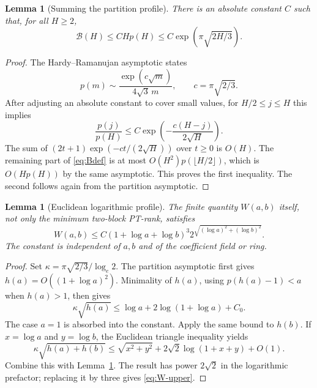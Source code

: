 \documentclass[11pt]{article}
\newtheorem{lemma}[theorem]{Lemma}
\theoremstyle{definition}
\theoremstyle{remark}
\newcommand{\Bnd}{\mathcal B}
\begin{document}
\begin{lemma}[Summing the partition profile]
\label{lem:B-asymptotic}
There is an absolute constant $C$ such that, for all $H\ge2$,
\begin{equation}
\label{eq:B-upper}
 \Bnd(H)\le CHp(H)
 \le C\exp\!\left(\pi\sqrt{2H/3}\right).
\end{equation}
\end{lemma}

\begin{proof}
The Hardy--Ramanujan asymptotic \cite{dlmf} states
\[
 p(m)\sim\frac{\exp(c\sqrt m)}{4\sqrt3\,m},
 \qquad c=\pi\sqrt{2/3}.
\]
After adjusting an absolute constant to cover small values, for
$H/2\le j\le H$ this implies
\[
 \frac{p(j)}{p(H)}
 \le C\exp\!\left(-\frac{c(H-j)}{2\sqrt H}\right).
\]
The sum of $(2t+1)\exp(-ct/(2\sqrt H))$ over $t\ge0$ is $O(H)$.
The remaining part of \eqref{eq:Bdef} is at most
$O(H^2)p(\lfloor H/2\rfloor)$, which is $O(Hp(H))$ by the same
asymptotic. This proves the first inequality. The second follows
again from the partition asymptotic.
\end{proof}

\begin{lemma}[Euclidean logarithmic profile]
\label{lem:euclidean}
The finite quantity $W(a,b)$ itself, not only the minimum
two-block PT-rank, satisfies
\begin{equation}
\label{eq:W-upper}
 W(a,b)\le
 C(1+\log a+\log b)^3
 2^{\sqrt{(\log a)^2+(\log b)^2}}.
\end{equation}
The constant is independent of $a,b$ and of the coefficient field
or ring.
\end{lemma}

\begin{proof}
Set $\kappa=\pi\sqrt{2/3}/\log_e2$. The partition asymptotic first
gives $h(a)=O((1+\log a)^2)$. Minimality of $h(a)$, using
$p(h(a)-1)<a$ when $h(a)>1$, then gives
\begin{equation}
\label{eq:h-invert}
 \kappa\sqrt{h(a)}
 \le\log a+2\log(1+\log a)+C_0.
\end{equation}
The case $a=1$ is absorbed into the constant. Apply the same bound
to $h(b)$. If $x=\log a$ and $y=\log b$, the Euclidean triangle
inequality yields
\[
 \kappa\sqrt{h(a)+h(b)}
 \le\sqrt{x^2+y^2}
 +2\sqrt2\log(1+x+y)+O(1).
\]
Combine this with Lemma~\ref{lem:B-asymptotic}. The result has
power $2\sqrt2$ in the logarithmic prefactor; replacing it by three
gives \eqref{eq:W-upper}.
\end{proof}
\end{document}
